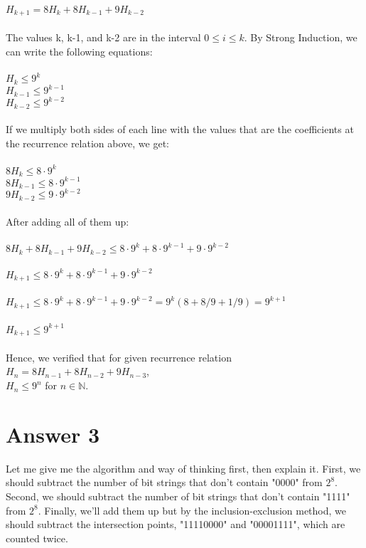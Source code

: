 \documentclass[12pt]{article}
\begin{document}
$H_{k+1} = 8H_k + 8H_{k-1} + 9H_{k-2}$\\\\

The values k, k-1, and k-2 are in the interval $0 \leq i \leq k$. By Strong Induction, we can write the following equations:\\\\

\noindent $H_k \leq 9^k$ \\
$H_{k-1} \leq 9^{k-1}$ \\
$H_{k-2} \leq 9^{k-2}$ \\\\
If we multiply both sides of each line with the values that are the coefficients at the recurrence relation above, we get:\\\\

\noindent $8H_k \leq 8\cdot9^k$ \\
$8H_{k-1} \leq 8\cdot9^{k-1}$ \\
$9H_{k-2} \leq 9\cdot9^{k-2}$ \\\\

After adding all of them up:\\\\

\noindent$8H_k + 8H_{k-1} + 9H_{k-2} \leq 8\cdot9^k + 8\cdot9^{k-1} + 9\cdot9^{k-2}$ \\\\
$H_{k+1} \leq 8\cdot9^k + 8\cdot9^{k-1} + 9\cdot9^{k-2}$ \\\\
$H_{k+1} \leq 8\cdot9^k + 8\cdot9^{k-1} + 9\cdot9^{k-2} = 9^k (8 + 8/9 + 1/9) = 9^{k+1}$\\\\
$H_{k+1} \leq 9^{k+1}$\\\\

Hence, we verified that for given recurrence relation $H_n = 8H_{n-1} + 8H_{n-2} + 9H_{n-3}$, \\ 
$H_n \leq 9^n$ for $n \in \mathbb{N}$.



\section*{Answer 3}

Let me give me the algorithm and way of thinking first, then explain it.
First, we should subtract the number of bit strings that don't contain "0000" from $2^8$. Second, we should subtract the number of bit strings that don't contain "1111" from $2^8$.  Finally, we'll add them up but by the inclusion-exclusion method, we should subtract the intersection points, "11110000" and "00001111", which are counted twice.\\\\ 
\end{document}
